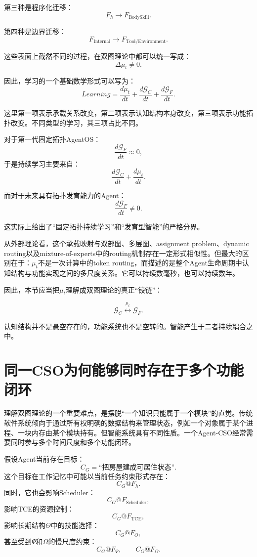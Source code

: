 第三种是程序化迁移：
\[
F_h
\rightarrow
F_{\text{BodySkill}}.
\]

第四种是边界迁移：
\[
F_{\text{Internal}}
\rightarrow
F_{\text{Tool/Environment}}.
\]

这些表面上截然不同的过程，在双图理论中都可以统一写成：
\[
\boxed{
\Delta\mu_t\neq0.
}
\]

因此，学习的一个基础数学形式可以写为：
\[
\boxed{
Learning
=
\frac{d\mu_t}{dt}
+
\frac{d\mathcal G_C}{dt}
+
\frac{d\mathcal G_F}{dt}.
}
\]

这里第一项表示承载关系改变，第二项表示认知结构本身改变，第三项表示功能拓扑改变。不同类型的学习，其三项占比不同。

对于第一代固定拓扑AgentOS：
\[
\frac{d\mathcal G_F}{dt}\approx0,
\]
于是持续学习主要来自：
\[
\frac{d\mathcal G_C}{dt}
+
\frac{d\mu_t}{dt}.
\]

而对于未来具有拓扑发育能力的Agent：
\[
\frac{d\mathcal G_F}{dt}\neq0.
\]

这实际上给出了“固定拓扑持续学习”和“发育型智能”的严格分界。

从外部理论看，这个承载映射与双部图、多层图、assignment problem、dynamic routing以及mixture-of-experts中的routing机制存在一定形式相似性。但最大的区别在于：$\mu_t$不是一次计算中的token routing，而描述的是整个Agent生命周期中认知结构与功能实现之间的多尺度关系。它可以持续数毫秒，也可以持续数年。

因此，本节应当把$\mu_t$理解成双图理论的真正“铰链”：

\[
\boxed{
\mathcal G_C
\overset{\mu_t}{\longleftrightarrow}
\mathcal G_F.
}
\]

认知结构并不是悬空存在的，功能系统也不是空转的。智能产生于二者持续耦合之中。

\section{同一CSO为何能够同时存在于多个功能闭环}

理解双图理论的一个重要难点，是摆脱“一个知识只能属于一个模块”的直觉。传统软件系统倾向于通过所有权明确的数据结构来管理状态，例如一个对象属于某个进程、一块内存由某个模块持有。但智能系统具有不同性质。一个Agent-CSO经常需要同时参与多个时间尺度和多个功能闭环。

假设Agent当前存在目标：
\[
C_G=\text{“把房屋建成可居住状态”}.
\]
这个目标在工作记忆中可能以当前任务约束形式存在：
\[
C_G@F_h.
\]
同时，它也会影响Scheduler：
\[
C_G@F_{\text{Scheduler}},
\]
影响TCE的资源控制：
\[
C_G@F_{\text{TCE}},
\]
影响长期结构$\Theta$中的技能选择：
\[
C_G@F_\Theta,
\]
甚至受到$\Psi$和$\Omega$的慢尺度约束：
\[
C_G@F_\Psi,
\qquad
C_G@F_\Omega.
\]

